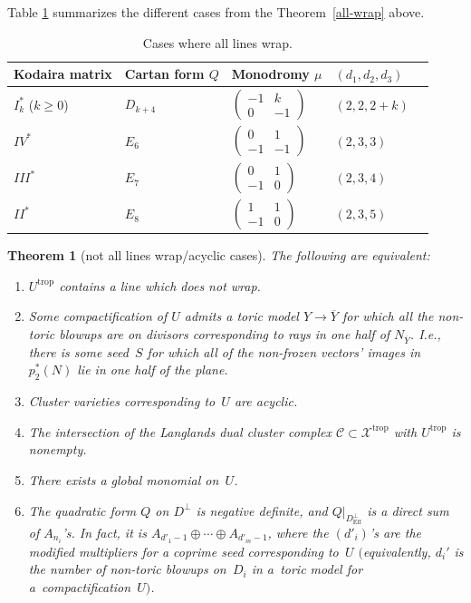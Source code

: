 \documentclass[10pt,a4paper]{amsart}
\numberwithin{equation}{section}
\numberwithin{figure}{section}
\numberwithin{table}{section}
\DeclareMathOperator{\trop}{trop}
\DeclareMathOperator{\Eff}{Eff}
\let\?=\overline
\let\rar=\rightarrow
\let\s=\mathcal
\newtheorem{thm}{Theorem}[section]
\theoremstyle{definition}
\begin{document}
Table \ref{wraptable} summarizes the different cases from the Theorem~\ref{all-wrap} above.

\begin{table}[h] \centering
 \begin{tabular}{ | l | l | l | l | l |}
 \hline
 Kodaira matrix & Cartan form $Q$ & Monodromy $\mu$ & $(d_1,d_2,d_3)$ \\ \hline
 $I^*_{k}$ ($k\geq 0$) & $D_{k+4}$ & 	 $\left(\begin{matrix}
		-1 &k \\
	 0 &-1
		\end{matrix}\right)$				& $(2,2,2+k)$ 	 \\ \hline
 $IV^*$ & $E_6$ & 		$\left(\begin{matrix}
		0 &1 \\
	 -1 &-1
		\end{matrix}\right)$		 & $(2,3,3)$	 \\ \hline
 $III^*$ &$E_7$ &	$\left(\begin{matrix}
		0 &1 \\
	 -1 &0
		\end{matrix}\right)$	 	 & $(2,3,4)$	 \\ \hline
 $II^*$ &$E_8$ & 	$\left(\begin{matrix}
		1 &1 \\
	 -1 &0
		\end{matrix}\right)$				& $(2,3,5)$		 \\ \hline
 \end{tabular}\caption{Cases where all lines wrap.}\label{wraptable}
 \end{table}


\begin{thm}[not all lines wrap/acyclic cases]\label{not-all-wrap}
The following are equivalent:
\begin{enumerate}\itemsep=0pt
\item[$1.$] $U^{\trop}$ contains a {line} which does not wrap.
\item[$2.$] Some compactification of $U$ admits a toric model $Y\rar \?{Y}$ for which all the non-toric blowups are on divisors corresponding to rays in one half of $N_{\?{Y}}$. I.e., there is some seed~$S$ for which all of the non-frozen vectors' images in~$p_2^*(N)$ lie in one half of the plane.
\item[$3.$] Cluster varieties corresponding to~$U$ are {acyclic}.
\item[$4.$] The intersection of the Langlands dual {cluster complex} $\s{C}\subset \s{X}^{\trop}$ with $U^{\trop}$ is non\-empty.
\item[$5.$] There exists a {global monomial} on~$U$.
\item[$6.$] The {quadratic form} $Q$ on $D^{\perp}$ is negative definite, and $Q|_{D^{\perp}_{\Eff}}$ is a direct sum of $A_{n_i}$'s. In fact, it is $A_{d'_1-1}\oplus \cdots \oplus A_{d'_m-1}$, where the $(d'_i)$'s are the modified multipliers for a coprime seed corresponding to~$U$ $($equivalently, $d_i'$ is the number of non-toric blowups on~$D_i$ in a~toric model for a~compactification~$U)$.
\end{enumerate}
\end{thm}
\end{document}
